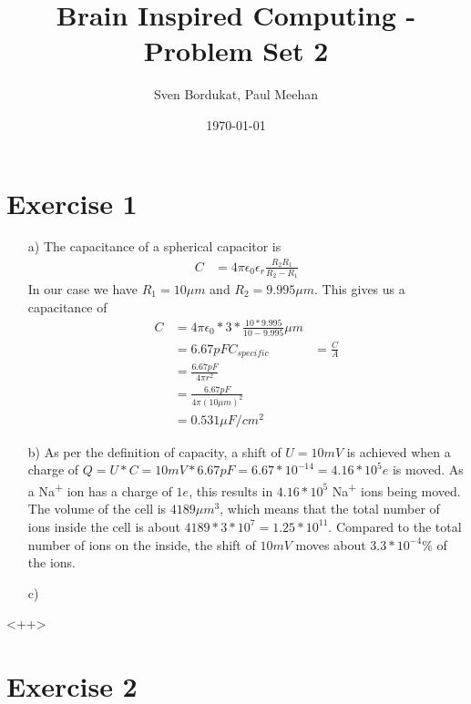\documentclass[a4paper]{article}
\begin{document}

\title{Brain Inspired Computing - Problem Set 2}

\author{Sven Bordukat, Paul Meehan}

\date{\today}

\maketitle

\section*{Exercise 1}
\begin{itemize}
    \item[a)]
    The capacitance of a spherical capacitor is
    \begin{align*}
        C&=4\pi\epsilon_0\epsilon_r\frac{R_2R_1}{R_2-R_1}
    \end{align*}
    In our case we have $R_1 = 10\mu m$ and $R_2 = 9.995\mu m$.
    This gives us a capacitance of
    \begin{align*}
        C&=4\pi\epsilon_0*3*\frac{10* 9.995}{10-9.995}\mu m\\
        &=6.67 pF
        C_{specific} &= \frac{C}{A}\\
        &= \frac{6.67pF}{4\pi r^2}\\
        &= \frac{6.67pF}{4\pi (10 \mu m)^2}\\
        &= 0.531 \mu F/cm^2
    \end{align*}

    \item[b)]
    As per the definition of capacity, a shift of $U=10mV$ is achieved when
    a charge of $Q=U*C=10mV*6.67pF=6.67*10^{-14}=4.16*10^5e$ is moved.
    As a Na\textsuperscript{+} ion has a charge of $1e$, this results in
    $4.16*10^5$ Na\textsuperscript{+} ions being moved. The volume of the cell
    is $4189\mu m^3$, which means that the total number of ions inside the cell
    is about $4189*3*10^7=1.25*10^{11}$. Compared to the total
    number of ions on the inside, the shift of $10mV$ moves about $3.3*10^{-4}\%$
    of the ions.
    \item[c)]

\end{itemize}<++>

\section*{Exercise 2}
\end{document}
